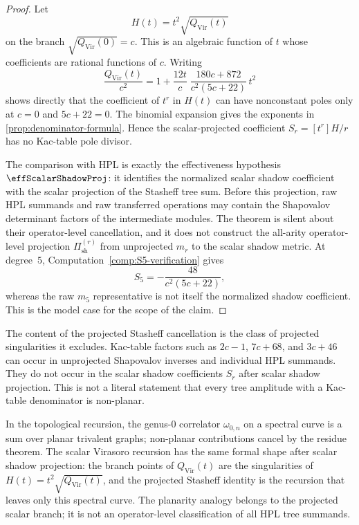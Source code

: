 \begin{proof}
Let
\[
H(t)=t^2\sqrt{Q_{\mathrm{Vir}}(t)}
\]
on the branch \(\sqrt{Q_{\mathrm{Vir}}(0)}=c\).  This is an algebraic
function of \(t\) whose coefficients are rational functions of \(c\).
Writing
\[
\frac{Q_{\mathrm{Vir}}(t)}{c^2}
=1+\frac{12t}{c}
\;
\frac{180c+872}{c^2(5c+22)}\,t^2
\]
shows directly that the coefficient of \(t^r\) in \(H(t)\) can have
nonconstant poles only at \(c=0\) and \(5c+22=0\).  The binomial
expansion gives the exponents in
\cref{prop:denominator-formula}.  Hence the scalar-projected
coefficient \(S_r=[t^r]H/r\) has no Kac-table pole divisor.

The comparison with HPL is exactly the effectiveness hypothesis
\(\effScalarShadowProj\): it identifies the normalized scalar
shadow coefficient with the scalar projection of the Stasheff tree
sum.  Before this projection, raw HPL summands and raw transferred
operations may contain the Shapovalov determinant factors of the
intermediate modules.  The theorem is silent about their
operator-level cancellation, and it does not construct the all-arity
operator-level projection
\(\Pi_{\mathrm{sh}}^{(r)}\) from unprojected \(m_r\) to the scalar
shadow metric.  At degree~\(5\),
Computation~\ref{comp:S5-verification} gives
\[
S_5=-\frac{48}{c^2(5c+22)},
\]
whereas the raw \(m_5\) representative is not itself the normalized
shadow coefficient.  This is the model case for the scope of the
claim.
\end{proof}

\begin{remark}
\label{rem:stasheff-planarity}%
%
%
%
The content of the projected Stasheff cancellation is the class of
projected singularities it excludes. Kac-table factors such as
\(2c-1\), \(7c+68\), and \(3c+46\) can occur in unprojected
Shapovalov inverses and individual HPL summands. They do not occur in
the scalar shadow coefficients \(S_r\) after scalar shadow projection.
This is not a literal statement that every tree amplitude with a
Kac-table denominator is non-planar.

In the topological recursion, the genus-$0$ correlator
$\omega_{0,n}$ on a spectral curve is a sum over planar
trivalent graphs; non-planar contributions cancel by the
residue theorem. The scalar Virasoro recursion has the same formal
shape after scalar shadow projection: the branch points of
\(Q_{\mathrm{Vir}}(t)\) are the singularities of
\(H(t)=t^2\sqrt{Q_{\mathrm{Vir}}(t)}\), and the projected Stasheff
identity is the recursion that leaves only this spectral curve.  The
planarity analogy belongs to the projected scalar branch; it is not an
operator-level classification of all HPL tree summands.
\end{remark}

